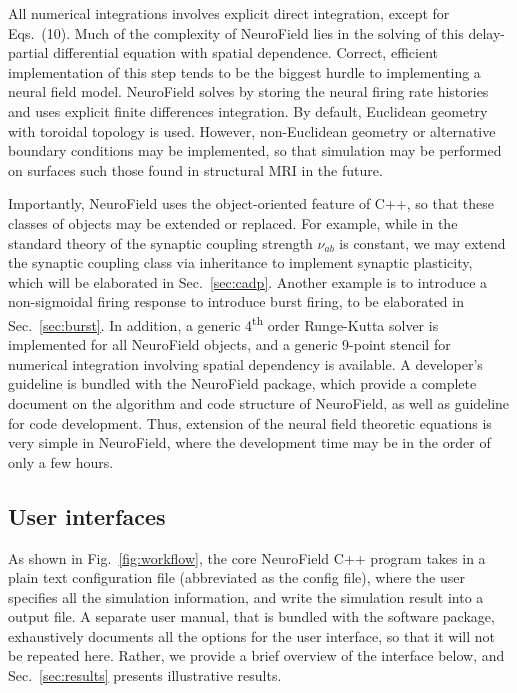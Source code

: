 \documentclass[preprint,review,10pt,authoryear,letterpaper]{elsarticle}
\begin{document}
All numerical integrations involves explicit direct integration, except for Eqs.~(10). Much of the complexity of NeuroField lies in the solving of this delay-partial differential equation with spatial dependence. Correct, efficient implementation of this step tends to be the biggest hurdle to implementing a neural field model. NeuroField solves by storing the neural firing rate  histories and uses explicit finite differences integration. By default, Euclidean geometry with toroidal topology is used. However, non-Euclidean geometry or alternative boundary conditions may be implemented, so that simulation may be performed on surfaces such those found in structural MRI in the future.

Importantly, NeuroField uses the object-oriented feature of C++, so that these classes of objects may be extended or replaced. For example, while in the standard theory of \citet{Robinson2005} the synaptic coupling strength \(\nu_{ab}\) is constant, we may extend the synaptic coupling class via inheritance to implement synaptic plasticity, which will be elaborated in Sec.~\ref{sec:cadp}. Another example is to introduce a non-sigmoidal firing response to introduce burst firing, to be elaborated in Sec.~\ref{sec:burst}. In addition, a generic 4\textsuperscript{th} order Runge-Kutta solver is implemented for all NeuroField objects, and a generic 9-point stencil for numerical integration involving spatial dependency is available. A developer's guideline is bundled with the NeuroField package, which provide a complete document on the algorithm and code structure of NeuroField, as well as guideline for code development. Thus, extension of the neural field theoretic equations is very simple in NeuroField, where the development time may be in the order of only a few hours.

\subsection{User interfaces}
\label{sec:interface}

As shown in Fig.~\ref{fig:workflow}, the core NeuroField C++ program takes in a plain text configuration file (abbreviated as the config file), where the user specifies all the simulation information, and write the simulation result into a output file. A separate user manual, that is bundled with the software package, exhaustively documents all the options for the user interface, so that it will not be repeated here. Rather, we provide a brief overview of the interface below, and Sec.~\ref{sec:results} presents illustrative results.
\end{document}
